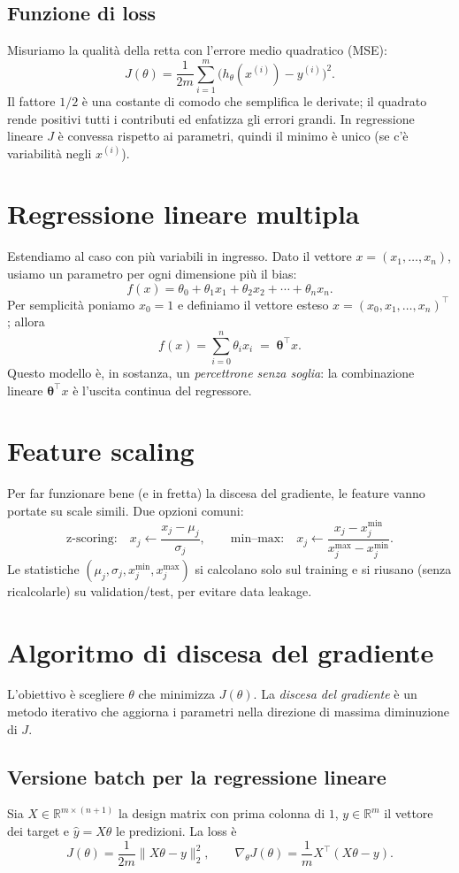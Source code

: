 \subsection{Funzione di loss}
Misuriamo la qualità della retta con l'errore medio quadratico (MSE):
\[
J(\theta)=\frac{1}{2m}\sum_{i=1}^{m}\big(h_\theta(x^{(i)})-y^{(i)}\big)^2.
\]
Il fattore \(1/2\) è una costante di comodo che semplifica le derivate; il quadrato rende
positivi tutti i contributi ed enfatizza gli errori grandi. In regressione lineare \(J\) è
convessa rispetto ai parametri, quindi il minimo è unico (se c'è variabilità negli \(x^{(i)}\)).

\section{Regressione lineare multipla}
Estendiamo al caso con più variabili in ingresso. Dato il vettore
\(x=(x_1,\dots,x_n)\), usiamo un parametro per ogni dimensione più il bias:
\[
f(x)=\theta_0+\theta_1x_1+\theta_2x_2+\cdots+\theta_n x_n .
\]
Per semplicità poniamo \(x_0=1\) e definiamo il vettore esteso
\(
x=(x_0,x_1,\dots,x_n)^\top
\);
allora
\[
f(x)=\sum_{i=0}^n \theta_i x_i \;=\; \boldsymbol{\theta}^\top x.
\]
Questo modello è, in sostanza, un \emph{percettrone senza soglia}: la combinazione lineare
\(\boldsymbol{\theta}^\top x\) è l'uscita continua del regressore.

\section{Feature scaling}
Per far funzionare bene (e in fretta) la discesa del gradiente, le feature vanno portate
su scale simili. Due opzioni comuni:
\[
\text{z-scoring:}\quad x_j\leftarrow\frac{x_j-\mu_j}{\sigma_j},
\qquad
\text{min--max:}\quad x_j\leftarrow\frac{x_j-x_j^{\min}}{x_j^{\max}-x_j^{\min}}.
\]
Le statistiche \((\mu_j,\sigma_j,x_j^{\min},x_j^{\max})\) si calcolano solo sul training e
si riusano (senza ricalcolarle) su validation/test, per evitare data leakage.

\section{Algoritmo di discesa del gradiente}
L’obiettivo è scegliere \(\theta\) che minimizza \(J(\theta)\). La \emph{discesa del gradiente}
è un metodo iterativo che aggiorna i parametri nella direzione di massima diminuzione di \(J\).

\subsection{Versione batch per la regressione lineare}
Sia \(X\in\mathbb{R}^{m\times(n+1)}\) la design matrix con prima colonna di \(1\),
\(y\in\mathbb{R}^{m}\) il vettore dei target e \(\hat y=X\theta\) le predizioni. La loss è
\[
J(\theta)=\frac{1}{2m}\|X\theta-y\|_2^2,\qquad
\nabla_\theta J(\theta)=\frac{1}{m}X^\top(X\theta-y).
\]
